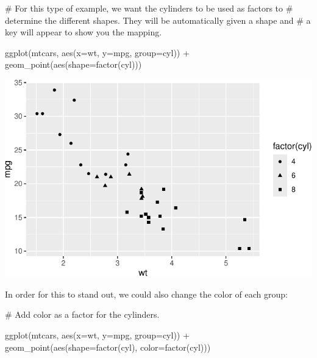 \documentclass[
  letterpaper,
  DIV=11,
  numbers=noendperiod]{scrreprt}
\newenvironment{Shaded}{\begin{snugshade}}{\end{snugshade}}
\newcommand{\AttributeTok}[1]{\textcolor[rgb]{0.40,0.45,0.13}{#1}}
\newcommand{\CommentTok}[1]{\textcolor[rgb]{0.37,0.37,0.37}{#1}}
\newcommand{\FunctionTok}[1]{\textcolor[rgb]{0.28,0.35,0.67}{#1}}
\newcommand{\NormalTok}[1]{\textcolor[rgb]{0.00,0.23,0.31}{#1}}
\newcommand{\SpecialCharTok}[1]{\textcolor[rgb]{0.37,0.37,0.37}{#1}}
\begin{document}
\begin{Shaded}
\begin{Highlighting}[]
\CommentTok{\# For this type of example, we want the cylinders to be used as factors to }
\CommentTok{\# determine the different shapes. They will be automatically given a shape and}
\CommentTok{\# a key will appear to show you the mapping.}

\FunctionTok{ggplot}\NormalTok{(mtcars, }\FunctionTok{aes}\NormalTok{(}\AttributeTok{x=}\NormalTok{wt, }\AttributeTok{y=}\NormalTok{mpg, }\AttributeTok{group=}\NormalTok{cyl)) }\SpecialCharTok{+}
  \FunctionTok{geom\_point}\NormalTok{(}\FunctionTok{aes}\NormalTok{(}\AttributeTok{shape=}\FunctionTok{factor}\NormalTok{(cyl)))}
\end{Highlighting}
\end{Shaded}

\includegraphics{Advanced_Scatterplot_Techniques_files/figure-pdf/unnamed-chunk-9-1.pdf}

In order for this to stand out, we could also change the color of each
group:

\begin{Shaded}
\begin{Highlighting}[]
\CommentTok{\# Add color as a factor for the cylinders.}

\FunctionTok{ggplot}\NormalTok{(mtcars, }\FunctionTok{aes}\NormalTok{(}\AttributeTok{x=}\NormalTok{wt, }\AttributeTok{y=}\NormalTok{mpg, }\AttributeTok{group=}\NormalTok{cyl)) }\SpecialCharTok{+}
  \FunctionTok{geom\_point}\NormalTok{(}\FunctionTok{aes}\NormalTok{(}\AttributeTok{shape=}\FunctionTok{factor}\NormalTok{(cyl), }\AttributeTok{color=}\FunctionTok{factor}\NormalTok{(cyl)))}
\end{Highlighting}
\end{Shaded}
\end{document}
